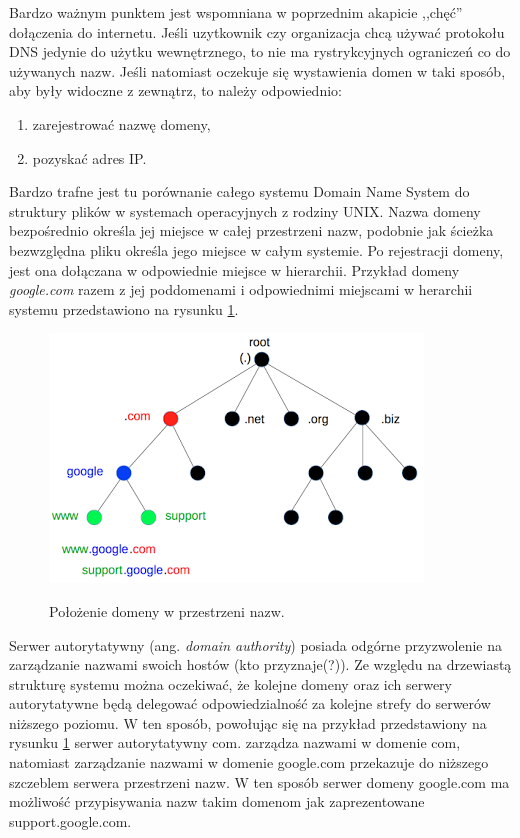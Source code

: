 Bardzo ważnym punktem jest wspomniana w poprzednim akapicie ,,chęć'' dołączenia do internetu. Jeśli uzytkownik czy organizacja chcą używać protokołu DNS jedynie do użytku wewnętrznego, to nie ma rystrykcyjnych ograniczeń co do używanych nazw. Jeśli natomiast oczekuje się wystawienia domen w taki sposób, aby były widoczne z zewnątrz, to należy odpowiednio:
\begin{enumerate}
	\item zarejestrować nazwę domeny,
	\item pozyskać adres IP.
\end{enumerate}

Bardzo trafne jest tu porównanie całego systemu Domain Name System do struktury plików w systemach operacyjnych z rodziny UNIX.  Nazwa domeny bezpośrednio określa jej miejsce w całej przestrzeni nazw, podobnie jak ścieżka bezwzględna pliku określa jego miejsce w całym systemie. Po rejestracji domeny, jest ona dołączana w odpowiednie miejsce w hierarchii. Przykład domeny \textit{google.com} razem z jej poddomenami i odpowiednimi miejscami w herarchii systemu przedstawiono na rysunku \ref{example_domain_tree}.

\begin{center}
	\begin{figure}
	\includegraphics[scale=1]{image/domain_tree}\label{example_domain_tree}
	\caption{Położenie domeny w przestrzeni nazw. \cite{domain_tree_src}}
	\end{figure}
\end{center}

Serwer autorytatywny (ang. \textit{domain authority}) posiada odgórne przyzwolenie na zarządzanie nazwami swoich hostów (kto przyznaje(?)). Ze względu na drzewiastą strukturę systemu można oczekiwać, że kolejne domeny oraz ich serwery autorytatywne będą delegować odpowiedzialność za kolejne strefy do serwerów niższego poziomu. W ten sposób, powołując się na przykład przedstawiony na rysunku \ref{example_domain_tree} serwer autorytatywny com. zarządza nazwami w domenie com, natomiast zarządzanie nazwami w domenie google.com przekazuje do niższego szczeblem serwera przestrzeni nazw. W ten sposób serwer domeny google.com ma możliwość przypisywania nazw takim domenom jak zaprezentowane support.google.com.

